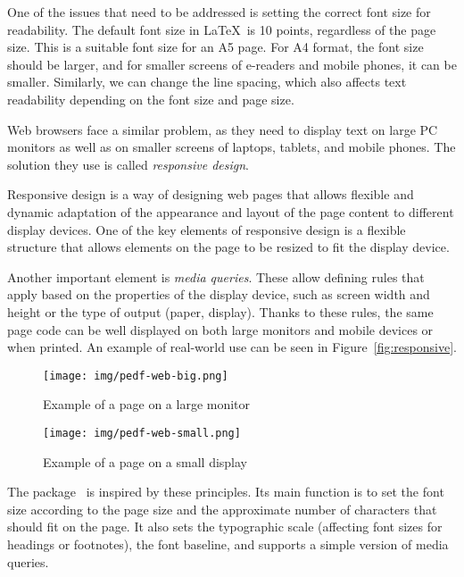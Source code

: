 \documentclass{ltugboat}
\begin{document}
One of the issues that need to be addressed is setting the correct font size
for readability. The default font size in \LaTeX\ is 10 points, regardless of
the page size. This is a suitable font size for an A5 page. For A4 format, the
font size should be larger, and for smaller screens of e-readers and mobile
phones, it can be smaller. Similarly, we can change the line spacing, which
also affects text readability depending on the font size and page size.

Web browsers face a similar problem, as they need to display text on large PC
monitors as well as on smaller screens of laptops, tablets, and mobile phones.
The solution they use is called \textit{responsive design}.

Responsive design is a way of designing web pages that allows flexible and
dynamic adaptation of the appearance and layout of the page content to
different display devices. One of the key elements of responsive design is a
flexible structure that allows elements on the page to be resized to fit the
display device.

Another important element is \textit{media queries}. These allow defining rules
that apply based on the properties of the display device, such as screen width
and height or the type of output (paper, display). Thanks to these rules, the
same page code can be well displayed on both large monitors and mobile devices
or when printed. An example of real-world use can be seen in
Figure~\ref{fig:responsive}.


\begin{figure*}[tbp]
\begin{subfigure}[t]{0.74\textwidth}
    \texttt{[image: img/pedf-web-big.png]}
    \caption{Example of a page on a large monitor}
\end{subfigure}
\hfill
\begin{subfigure}[t]{0.24\textwidth}
    \texttt{[image: img/pedf-web-small.png]}
    \caption{Example of a page on a small display}
\end{subfigure}
  \caption{Example of displaying a web page using responsive
  design}\label{fig:responsive}
\end{figure*}

The  package~\cite{responsive} is inspired by these
principles. Its main function is to set the font size according to the page
size and the approximate number of characters that should fit on the page. It
also sets the typographic scale (affecting font sizes for headings or
footnotes), the font baseline, and supports a simple version of media queries.
\end{document}
